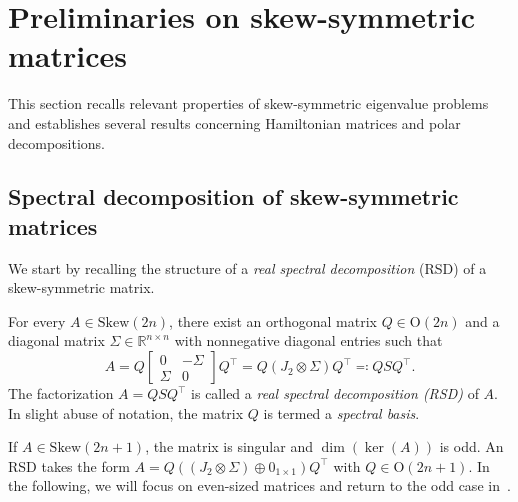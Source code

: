 \documentclass[final,onefignum,onetabnum,dvipsnames]{siamart251216}
\numberwithin{algorithm}{section}
\numberwithin{equation}{section}
\begin{document}
\section{Preliminaries on skew-symmetric matrices}\label{sec:preliminaries}

This section recalls relevant properties of skew-symmetric eigenvalue problems and establishes several results concerning Hamiltonian matrices and polar decompositions.

\subsection{Spectral decomposition of skew-symmetric matrices}

We start by recalling the structure of a \emph{real spectral decomposition} (RSD) of a skew-symmetric matrix. %
\begin{lemma}\label{lem:rsd_existence}
    For every $A\in\mathrm{Skew}(2n)$, there exist an orthogonal matrix $Q\in\mathrm{O}(2n)$ and a diagonal matrix $\Sigma\in\mathbb{R}^{n\times n}$ with nonnegative diagonal entries such that
    \begin{equation}\label{eq:spectral_decomposition}
        A = Q \begin{bmatrix}
                0&-\Sigma\\
                \Sigma& 0
            \end{bmatrix}Q^\top = Q(J_2 \otimes \Sigma)Q^\top \eqcolon QSQ^\top.
    \end{equation}
    The factorization $A = QSQ^\top$ is called a \emph{real spectral decomposition (RSD)} of $A$. In slight abuse of notation, the matrix $Q$ is termed a \emph{spectral basis}.
\end{lemma}

If $A\in \mathrm{Skew}(2n+1)$, the matrix is singular and $\dim(\ker(A))$ is odd. An RSD takes the form $A  = Q((J_2 \otimes \Sigma) \oplus 0_{1\times 1})Q^\top $ with $Q \in \mathrm{O}(2n+1)$.  In the following, we will focus on even-sized matrices and return to the odd case in~.
\end{document}
